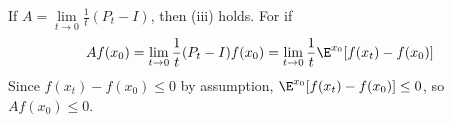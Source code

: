 \begin{note}
If $A = \lim\limits_{t \to 0} \frac{1}{t} (P_t - I)$, then (iii) holds. For if
$$\begin{aligned}
A f(x_0) =  \lim\limits_{t \to 0} \frac{1}{t} (P_t - I) f(x_0) =  \lim_{t \to 0} \frac{1}{t} \E^{x_0} [f(x_t) - f(x_0)]
\end{aligned}$$
Since $f(x_t) - f(x_0) \leq 0$ by assumption, $\E^{x_0} [f(x_t) - f(x_0)] \leq 0$, so $A f(x_0) \leq 0$. 
\end{note}

%

%
